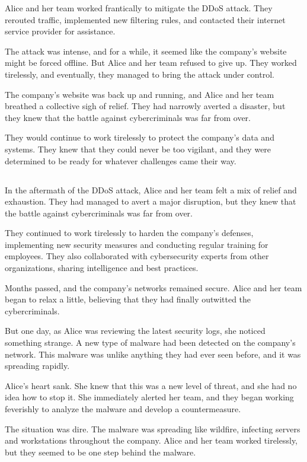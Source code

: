 \documentclass{./StyCls/MyArticle}
\begin{document}
Alice and her team worked frantically to mitigate the DDoS attack. They rerouted traffic, implemented new filtering rules, and contacted their internet service provider for assistance.

The attack was intense, and for a while, it seemed like the company's website might be forced offline. But Alice and her team refused to give up. They worked tirelessly, and eventually, they managed to bring the attack under control.

The company's website was back up and running, and Alice and her team breathed a collective sigh of relief. They had narrowly averted a disaster, but they knew that the battle against cybercriminals was far from over.

They would continue to work tirelessly to protect the company's data and systems. They knew that they could never be too vigilant, and they were determined to be ready for whatever challenges came their way.

\subsection{}


In the aftermath of the DDoS attack, Alice and her team felt a mix of relief and exhaustion. They had managed to avert a major disruption, but they knew that the battle against cybercriminals was far from over.

They continued to work tirelessly to harden the company's defenses, implementing new security measures and conducting regular training for employees. They also collaborated with cybersecurity experts from other organizations, sharing intelligence and best practices.

Months passed, and the company's networks remained secure. Alice and her team began to relax a little, believing that they had finally outwitted the cybercriminals.

But one day, as Alice was reviewing the latest security logs, she noticed something strange. A new type of malware had been detected on the company's network. This malware was unlike anything they had ever seen before, and it was spreading rapidly.

Alice's heart sank. She knew that this was a new level of threat, and she had no idea how to stop it. She immediately alerted her team, and they began working feverishly to analyze the malware and develop a countermeasure.

The situation was dire. The malware was spreading like wildfire, infecting servers and workstations throughout the company. Alice and her team worked tirelessly, but they seemed to be one step behind the malware.
\end{document}

